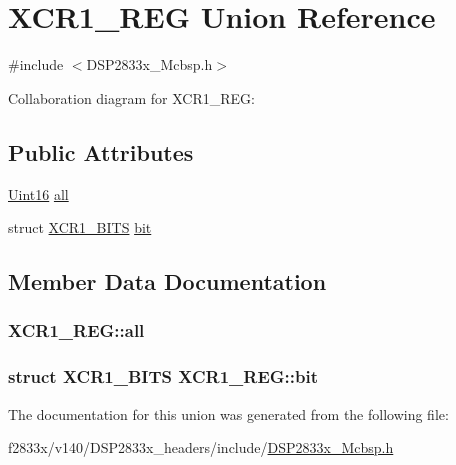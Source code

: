 \hypertarget{union_x_c_r1___r_e_g}{}\section{X\+C\+R1\+\_\+\+R\+E\+G Union Reference}
\label{union_x_c_r1___r_e_g}


{\ttfamily \#include $<$D\+S\+P2833x\+\_\+\+Mcbsp.\+h$>$}



Collaboration diagram for X\+C\+R1\+\_\+\+R\+E\+G\+:
\subsection*{Public Attributes}
\begin{DoxyCompactItemize}
\item 
\hyperlink{_d_s_p2833x___device_8h_a59a9f6be4562c327cbfb4f7e8e18f08b}{Uint16} \hyperlink{union_x_c_r1___r_e_g_a502df39597587520b8a65ee7ecf9d221}{all}
\item 
struct \hyperlink{struct_x_c_r1___b_i_t_s}{X\+C\+R1\+\_\+\+B\+I\+T\+S} \hyperlink{union_x_c_r1___r_e_g_ad40340b7256a373dfb3fa5d6ed5771b5}{bit}
\end{DoxyCompactItemize}


\subsection{Member Data Documentation}
\hypertarget{union_x_c_r1___r_e_g_a502df39597587520b8a65ee7ecf9d221}{}
\subsubsection[{all}]{ X\+C\+R1\+\_\+\+R\+E\+G\+::all}\label{union_x_c_r1___r_e_g_a502df39597587520b8a65ee7ecf9d221}
\hypertarget{union_x_c_r1___r_e_g_ad40340b7256a373dfb3fa5d6ed5771b5}{}
\subsubsection[{bit}]{\setlength{\rightskip}{0pt plus 5cm}struct {\bf X\+C\+R1\+\_\+\+B\+I\+T\+S} X\+C\+R1\+\_\+\+R\+E\+G\+::bit}\label{union_x_c_r1___r_e_g_ad40340b7256a373dfb3fa5d6ed5771b5}


The documentation for this union was generated from the following file\+:\begin{DoxyCompactItemize}
\item 
f2833x/v140/\+D\+S\+P2833x\+\_\+headers/include/\hyperlink{_d_s_p2833x___mcbsp_8h}{D\+S\+P2833x\+\_\+\+Mcbsp.\+h}\end{DoxyCompactItemize}
